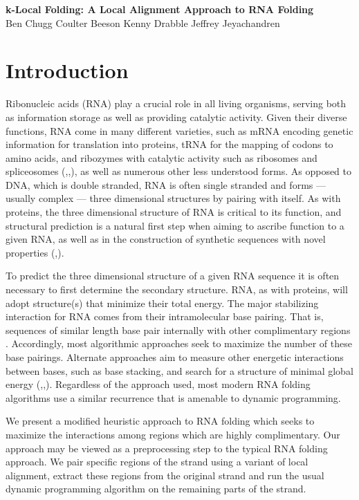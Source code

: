 \documentclass[11pt]{article}
\begin{document}
\begin{center}
\Large\textbf{k-Local Folding: A Local Alignment Approach to RNA Folding}\\
\vspace*{0.8cm}
\large 
Ben Chugg \qquad
Coulter Beeson \qquad
Kenny Drabble \qquad
Jeffrey Jeyachandren 
\end{center}
\vspace*{0.3cm}

\section{Introduction}

Ribonucleic acids (RNA) play a crucial role in all living organisms, serving both as information storage as well as providing catalytic activity. Given their diverse functions, RNA come in many different varieties, such as mRNA encoding genetic information for translation into proteins, tRNA for the mapping of codons to amino acids, and ribozymes with catalytic activity such as ribosomes and spliceosomes (\cite{eight},\cite{nine},\cite{ten}), as well as numerous other less understood forms. As opposed to DNA, which is double stranded, RNA is often single stranded and forms --- usually complex ---  three dimensional structures by pairing with itself. As with proteins, the three dimensional structure of RNA is critical to its function, and structural prediction is a natural first step when aiming to ascribe function to a given RNA, as well as in the construction of synthetic sequences with novel properties (\cite{one},\cite{two}). 

To predict the three dimensional structure of a given RNA sequence it is often necessary to first determine the secondary structure. RNA, as with proteins, will adopt structure(s) that minimize their total energy. The major stabilizing interaction for RNA comes from their intramolecular base pairing. That is, sequences of similar length base pair internally with other complimentary regions \cite{three}. Accordingly, most algorithmic approaches seek to maximize the number of these base pairings. Alternate approaches aim to measure other energetic interactions between bases, such as base stacking, and search for a structure of minimal global energy (\cite{four},\cite{five},\cite{eight}). Regardless of the approach used, most modern RNA folding algorithms use a similar recurrence that is amenable to dynamic programming. 

We present a modified heuristic approach to RNA folding which seeks to maximize the interactions among regions which are highly complimentary. Our approach may be viewed as a preprocessing step to the typical RNA folding approach. We pair specific regions of the strand using a variant of local alignment, extract these regions from the original strand and run the usual dynamic programming algorithm on the remaining parts of the strand. 
\end{document}
